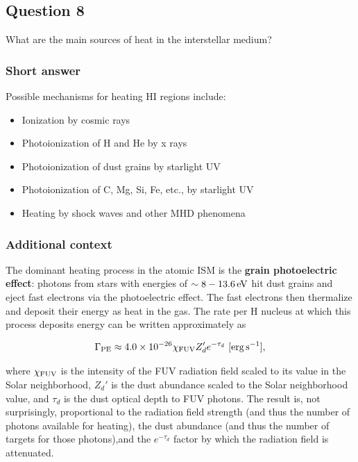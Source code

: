 \documentclass[a4paper,10pt]{article}
\begin{document}
\newpage
\subsection{Question 8}

What are the main sources of heat in the interstellar medium?

\subsubsection{Short answer}

Possible mechanisms for heating HI regions include:

\begin{itemize}
    \item Ionization by cosmic rays
    \item Photoionization of H and He by x rays
    \item Photoionization of dust grains by starlight UV
    \item Photoionization of C, Mg, Si, Fe, etc., by starlight UV
    \item Heating by shock waves and other MHD phenomena
\end{itemize}

\subsubsection{Additional context}

The dominant heating process in the atomic ISM is the \textbf{grain photoelectric effect}: photons from stars with energies of $\sim8-13.6\,{\rm eV}$ hit dust grains and eject fast electrons via the photoelectric effect. The fast electrons then thermalize and deposit their energy as heat in the gas. The rate per H nucleus at which this process deposits energy can be written approximately as

\begin{align*}
    \Gamma_{\rm PE} \approx 4.0\times10^{-26}\chi_{\rm FUV}Z_d'e^{-\tau_d} ~ [{\rm erg\,s^{-1}}],
\end{align*}

{\noindent}where $\chi_{\rm FUV}$ is the intensity of the FUV radiation field scaled to its value in the Solar neighborhood, $Z_d'$ is the dust abundance scaled
to the Solar neighborhood value, and $\tau_d$ is the dust optical depth to FUV photons. The result is, not surprisingly, proportional to the radiation field strength (and thus the number of photons available for heating), the dust abundance (and thus the number of targets for those photons),and the $e^{-\tau_d}$ factor by which the radiation field is attenuated.
\end{document}
